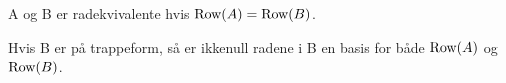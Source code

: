 A og B er radekvivalente hvis $\text{Row}(A) = \text{Row}(B)$.

Hvis B er på trappeform, så er ikkenull radene i B
en basis for både $\text{Row}(A)$ og $\text{Row}(B)$.
